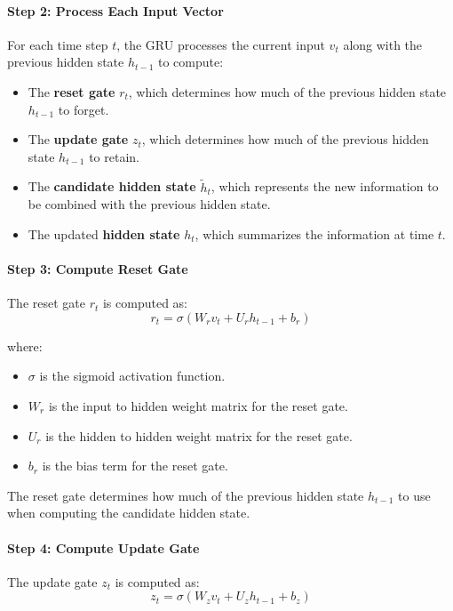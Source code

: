 \documentclass[12pt,a4paper]{article}
\begin{document}
\paragraph{Step 2: Process Each Input Vector}
For each time step $t$, the GRU processes the current input $v_t$ along with the previous hidden state $h_{t-1}$ to compute:
\begin{itemize}
    \item The \textbf{reset gate} $r_t$, which determines how much of the previous hidden state $h_{t-1}$ to forget.
    \item The \textbf{update gate} $z_t$, which determines how much of the previous hidden state $h_{t-1}$ to retain.
    \item The \textbf{candidate hidden state} $\tilde{h}_t$, which represents the new information to be combined with the previous hidden state.
    \item The updated \textbf{hidden state} $h_t$, which summarizes the information at time $t$.
\end{itemize}

\paragraph{Step 3: Compute Reset Gate}
The reset gate $r_t$ is computed as:
\begin{equation}
    r_t = \sigma(W_r v_t + U_r h_{t-1} + b_r)
\end{equation}

where:
\begin{itemize}
    \item $\sigma$ is the sigmoid activation function.
    \item $W_r$ is the input to hidden weight matrix for the reset gate.
    \item $U_r$ is the hidden to hidden weight matrix for the reset gate.
    \item $b_r$ is the bias term for the reset gate.
\end{itemize}
The reset gate determines how much of the previous hidden state $h_{t-1}$ to use when computing the candidate hidden state.

\paragraph{Step 4: Compute Update Gate}
The update gate $z_t$ is computed as:
\begin{equation}
    z_t = \sigma(W_z v_t + U_z h_{t-1} + b_z)
\end{equation}
\end{document}
